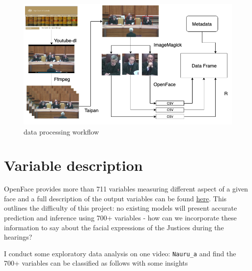 \documentclass{monashthesis}
\begin{document}
\begin{figure}
\includegraphics[width=1\linewidth]{figures/workflow} \caption{data processing workflow \label{fig:workflow}}\label{fig:unnamed-chunk-1}
\end{figure}

\hypertarget{variable-description}{%
\section{Variable description}\label{variable-description}}

OpenFace provides more than 711 variables measuring different aspect of a given face and a full description of the output variables can be found \href{https://github.com/TadasBaltrusaitis/OpenFace/wiki/Action-Units}{here}. This outlines the difficulty of this project: no existing models will present accurate prediction and inference using 700+ variables - how can we incorporate these information to say about the facial expressions of the Justices during the hearings?

I conduct some exploratory data analysis on one video: \texttt{Nauru\_a} and find the 700+ variables can be classified as follows with some insights
\end{document}
